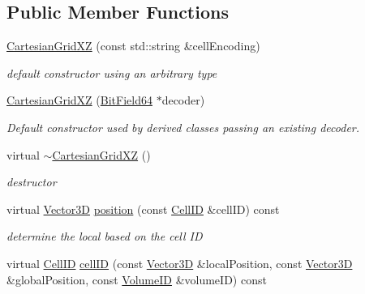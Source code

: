 \subsection*{Public Member Functions}
\begin{DoxyCompactItemize}
\item 
\hyperlink{class_d_d4hep_1_1_d_d_segmentation_1_1_cartesian_grid_x_z_a30db21b84e994f6e735274ac33a2b6af}{CartesianGridXZ} (const std::string \&cellEncoding)
\begin{DoxyCompactList}\small\item\em default constructor using an arbitrary type \item\end{DoxyCompactList}\item 
\hyperlink{class_d_d4hep_1_1_d_d_segmentation_1_1_cartesian_grid_x_z_a0a3f69150eb5dae849511529138ba094}{CartesianGridXZ} (\hyperlink{class_d_d4hep_1_1_d_d_segmentation_1_1_bit_field64}{BitField64} $\ast$decoder)
\begin{DoxyCompactList}\small\item\em Default constructor used by derived classes passing an existing decoder. \item\end{DoxyCompactList}\item 
virtual \hyperlink{class_d_d4hep_1_1_d_d_segmentation_1_1_cartesian_grid_x_z_a2e43952843eb3f66c0ab65c779045b1f}{$\sim$CartesianGridXZ} ()
\begin{DoxyCompactList}\small\item\em destructor \item\end{DoxyCompactList}\item 
virtual \hyperlink{struct_d_d4hep_1_1_d_d_segmentation_1_1_vector3_d}{Vector3D} \hyperlink{class_d_d4hep_1_1_d_d_segmentation_1_1_cartesian_grid_x_z_a44fb20b19214cb7a56e1d17e3edf3c5f}{position} (const \hyperlink{namespace_d_d4hep_1_1_d_d_segmentation_ac7af071d85cb48820914434a07e21ba1}{CellID} \&cellID) const 
\begin{DoxyCompactList}\small\item\em determine the local based on the cell ID \item\end{DoxyCompactList}\item 
virtual \hyperlink{namespace_d_d4hep_1_1_d_d_segmentation_ac7af071d85cb48820914434a07e21ba1}{CellID} \hyperlink{class_d_d4hep_1_1_d_d_segmentation_1_1_cartesian_grid_x_z_a6db94d0b7df8a5ad6bb3a708281ddd4e}{cellID} (const \hyperlink{struct_d_d4hep_1_1_d_d_segmentation_1_1_vector3_d}{Vector3D} \&localPosition, const \hyperlink{struct_d_d4hep_1_1_d_d_segmentation_1_1_vector3_d}{Vector3D} \&globalPosition, const \hyperlink{namespace_d_d4hep_1_1_d_d_segmentation_a61a6833a18d1800bdef176595f83e3ba}{VolumeID} \&volumeID) const 

\end{DoxyCompactItemize}
